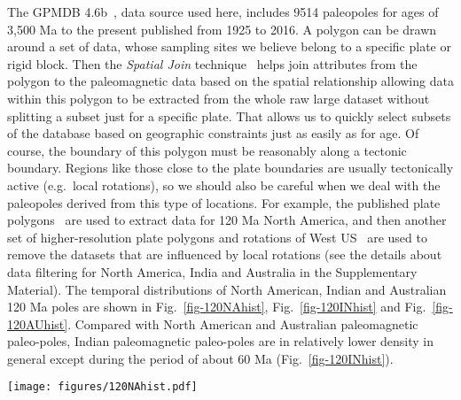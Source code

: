 The GPMDB 4.6b~\cite{P05}, data source used here, includes 9514 paleopoles for
ages of 3,500 Ma to the present published from 1925 to 2016. A polygon can be
drawn around a set of data, whose sampling sites we believe belong to a specific
plate or rigid block. Then the {\em Spatial Join\/} technique~\cite{J07} helps
join attributes from the polygon to the paleomagnetic data based on the spatial
relationship allowing data within this polygon to be extracted from the whole
raw large dataset without splitting a subset just for a specific plate. That
allows us to quickly select subsets of the database based on geographic
constraints just as easily as for age. Of course, the boundary of this polygon
must be reasonably along a tectonic boundary. Regions like those close to the
plate boundaries are usually tectonically active (e.g.\ local rotations), so we
should also be careful when we deal with the paleopoles derived from this type
of locations. For example, the published plate polygons~\cite{Y18} are used to
extract data for 120 Ma North America, and then another set of
higher-resolution plate polygons and rotations of West US~\cite{Mc06} are used
to remove the datasets that are influenced by local rotations (see the details
about data filtering for North America, India and Australia in the Supplementary
Material). The temporal distributions of North American, Indian and Australian
120 Ma poles are shown in Fig.~\ref{fig-120NAhist},
Fig.~\ref{fig-120INhist} and Fig.~\ref{fig-120AUhist}. Compared with North
American and Australian paleomagnetic paleo-poles, Indian paleomagnetic
paleo-poles are in relatively lower density in general except during the period
of about 60 Ma (Fig.~\ref{fig-120INhist}).

\begin{figure*}
\centering
\texttt{[image: figures/120NAhist.pdf]}
\caption[Distribution of 120 Ma North American poles]{Temporal
distribution of 120 Ma $NAC$ (101) paleomagnetic poles in 10 Myr
binning and 5 Myr step. For distribution a, each bin only counts in the
midpoints of pole error bars (not including those right at bin edges); For
distribution b, as long as the bar intersects with the bin (not including those
intersecting only at one of bin edges), it is counted in. Inside the
parentheses, i means igneous rocks derived (red bars), r means sedimentary rocks
with redbeds involved derived (orange bars), and m means metamorphic-dominated
rocks derived (blue bars); the left are pure sedimentary rocks derived (black
bars). The midpoints published not later than 1983 are black-dotted.}\label{fig-120NAhist}
\end{figure*}

